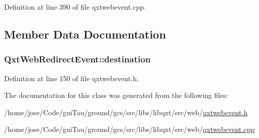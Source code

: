 Definition at line 390 of file qxtwebevent.\-cpp.



\subsection{Member Data Documentation}
\hypertarget{class_qxt_web_redirect_event_a90be909646cd7df01a88058cdb3cbb8a}{
\subsubsection[{destination}]{ Qxt\-Web\-Redirect\-Event\-::destination}}\label{class_qxt_web_redirect_event_a90be909646cd7df01a88058cdb3cbb8a}


Definition at line 150 of file qxtwebevent.\-h.



The documentation for this class was generated from the following files\-:\begin{DoxyCompactItemize}
\item 
/home/jose/\-Code/gui\-Tau/ground/gcs/src/libs/libqxt/src/web/\hyperlink{qxtwebevent_8h}{qxtwebevent.\-h}\item 
/home/jose/\-Code/gui\-Tau/ground/gcs/src/libs/libqxt/src/web/\hyperlink{qxtwebevent_8cpp}{qxtwebevent.\-cpp}\end{DoxyCompactItemize}
